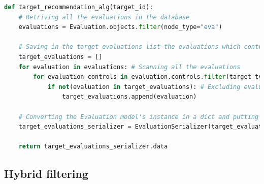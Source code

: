 

\lstset{style=python_code_style}
\label{lst:IB_CF_Target}
\begin{lstlisting}[language=Python, caption={Implementazione del IB-CF per i Target supportati da Moon Cloud.}]
def target_recommendation_alg(target_id):
	# Retriving all the evaluations in the database
	evaluations = Evaluation.objects.filter(node_type="eva")

	# Saving in the target_evaluations list the evaluations which controls have target_type_id equal to target_id
	target_evaluations = []
	for evaluation in evaluations: # Scanning all the evaluations
		for evaluation_controls in evaluation.controls.filter(target_type_id=target_id):
			if not(evaluation in target_evaluations): # Excluding evaluations duplicated
				target_evaluations.append(evaluation)

	# Converting the Evaluation model's instance in a dict and putting the evaluation, as a dict, in a list
	target_evaluations_serializer = EvaluationSerializer(target_evaluations, many=True)

	return target_evaluations_serializer.data
\end{lstlisting}



\subsection{Hybrid filtering} 

